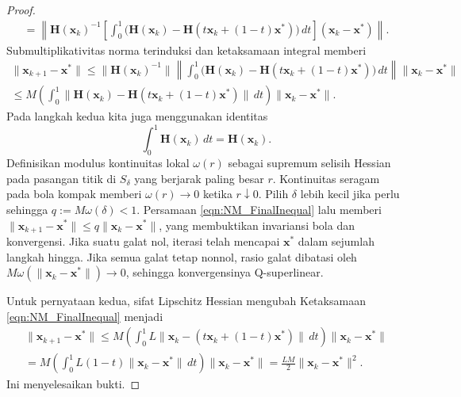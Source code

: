 \begin{proof}
\begin{multline}
=\left\lVert\mathbf{H}(\mathbf{x}_k)^{-1}
\left[\int_0^1\bigl(\mathbf{H}(\mathbf{x}_k)-
\mathbf{H}(t\mathbf{x}_k+(1-t)\mathbf{x}^*)\bigr)\,dt\right]
(\mathbf{x}_k-\mathbf{x}^*)\right\rVert.
\end{multline}
Submultiplikativitas norma terinduksi dan ketaksamaan integral memberi
\begin{multline}
\lVert\mathbf{x}_{k+1}-\mathbf{x}^*\rVert
\leq\lVert\mathbf{H}(\mathbf{x}_k)^{-1}\rVert
\left\lVert\int_0^1\bigl(\mathbf{H}(\mathbf{x}_k)-
\mathbf{H}(t\mathbf{x}_k+(1-t)\mathbf{x}^*)\bigr)\,dt\right\rVert
\lVert\mathbf{x}_k-\mathbf{x}^*\rVert\\
\leq M\left(\int_0^1
\lVert\mathbf{H}(\mathbf{x}_k)-
\mathbf{H}(t\mathbf{x}_k+(1-t)\mathbf{x}^*)\rVert\,dt\right)
\lVert\mathbf{x}_k-\mathbf{x}^*\rVert.
\label{eqn:NM_FinalInequal}
\end{multline}
Pada langkah kedua kita juga menggunakan identitas
\begin{displaymath}
\int_0^1\mathbf{H}(\mathbf{x}_k)\,dt=\mathbf{H}(\mathbf{x}_k).
\end{displaymath}
Definisikan modulus kontinuitas lokal $\omega(r)$ sebagai supremum selisih Hessian pada pasangan titik di $S_\delta$ yang berjarak paling besar $r$. Kontinuitas seragam pada bola kompak memberi $\omega(r)\to0$ ketika $r\downarrow0$. Pilih $\delta$ lebih kecil jika perlu sehingga $q:=M\omega(\delta)<1$. Persamaan \ref{eqn:NM_FinalInequal} lalu memberi $\lVert\mathbf{x}_{k+1}-\mathbf{x}^*\rVert\leq q\lVert\mathbf{x}_k-\mathbf{x}^*\rVert$, yang membuktikan invariansi bola dan konvergensi. Jika suatu galat nol, iterasi telah mencapai $\mathbf{x}^*$ dalam sejumlah langkah hingga. Jika semua galat tetap nonnol, rasio galat dibatasi oleh $M\omega(\lVert\mathbf{x}_k-\mathbf{x}^*\rVert)\to0$, sehingga konvergensinya Q-superlinear.

Untuk pernyataan kedua, sifat Lipschitz Hessian mengubah Ketaksamaan \ref{eqn:NM_FinalInequal} menjadi
\begin{multline}
\lVert\mathbf{x}_{k+1}-\mathbf{x}^*\rVert
\leq M\left(\int_0^1L
\lVert\mathbf{x}_k-(t\mathbf{x}_k+(1-t)\mathbf{x}^*)\rVert\,dt\right)
\lVert\mathbf{x}_k-\mathbf{x}^*\rVert\\
=M\left(\int_0^1L(1-t)\lVert\mathbf{x}_k-\mathbf{x}^*\rVert\,dt\right)
\lVert\mathbf{x}_k-\mathbf{x}^*\rVert
=\frac{LM}{2}\lVert\mathbf{x}_k-\mathbf{x}^*\rVert^2.
\end{multline}
Ini menyelesaikan bukti.
\end{proof}

